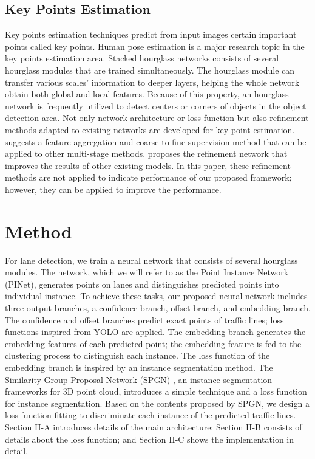 \documentclass[journal]{IEEEtran}
\begin{document}
\subsection{Key Points Estimation}

Key points estimation techniques predict from input images certain important points called key points. Human pose estimation \cite{yang2017learning} is a major research topic in the key points estimation area. Stacked hourglass networks \cite{newell2016stacked} consists of several hourglass modules that are trained simultaneously. The hourglass module can transfer various scales' information to deeper layers, helping the whole network obtain both global and local features. Because of this property, an hourglass network is frequently utilized to detect centers or corners of objects in the object detection area. Not only network architecture or loss function but also refinement methods adapted to existing networks are developed for key point estimation. \cite{li2019rethinking} suggests a feature aggregation and coarse-to-fine supervision method that can be applied to other multi-stage methods. \cite{moon2019posefix} proposes the refinement network that improves the results of other existing models. In this paper, these refinement methods are not applied to indicate performance of our proposed framework; however, they can be applied to improve the performance. 



\section{Method}

For lane detection, we train a neural network that consists of several hourglass modules. The network, which we will refer to as the Point Instance Network (PINet), generates points on lanes and distinguishes predicted points into individual instance. To achieve these tasks, our proposed neural network includes three output branches, a confidence branch, offset branch, and embedding branch. The confidence and offset branches predict exact points of traffic lines; loss functions inspired from YOLO \cite{redmon2016you} are applied. The embedding branch generates the embedding features of each predicted point; the embedding feature is fed to the clustering process to distinguish each instance. The loss function of the embedding branch is inspired by an instance segmentation method. The Similarity Group Proposal Network (SPGN) \cite{wang2018sgpn}, an instance segmentation frameworks for 3D point cloud, introduces a simple technique and a loss function for instance segmentation. Based on the contents proposed by SPGN, we design a loss function fitting to discriminate each instance of the predicted traffic lines. Section II-A introduces details of the main architecture; Section II-B consists of details about the loss function; and Section II-C shows the implementation in detail.
\end{document}
